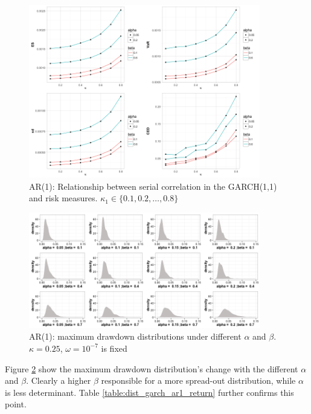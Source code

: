 \documentclass[11pt]{article}
\begin{document}
\begin{figure}[H]
\centering
\includegraphics[width = 0.9\textwidth]{../figures/simulation_garch/garch_AR1_risk_measures_ar1}
\caption{AR(1): Relationship between serial correlation in the GARCH(1,1) and risk measures. $\kappa_1 \in \{0.1,0.2, \dots, 0.8 \}$}
\label{fig:garch_rm_coef1}
\end{figure}

\begin{figure}[H]
\centering
\includegraphics[width = 0.9\textwidth]{../figures/simulation_garch/garch_AR1_alpha_beta}
\caption{AR(1): maximum drawdown distributions under different $\alpha$ and $\beta$. $\kappa = 0.25$, $\omega = 10^{-7}$ is fixed }
\label{fig:garch_ar1_ddd}
\end{figure}

Figure \ref{fig:garch_ar1_ddd} show the maximum drawdown distribution's change with the different $\alpha$ and $\beta$. Clearly a higher $\beta$ responsible for a more spread-out distribution, while $\alpha$ is less determinant. Table \ref{table:dist_garch_ar1_return} further confirms this point.
\end{document}
